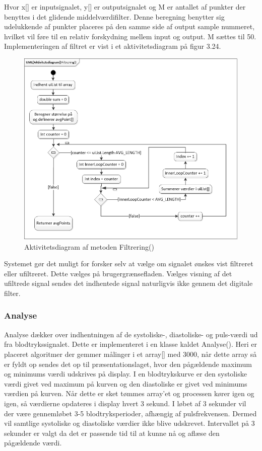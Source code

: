 Hvor x[] er inputsignalet, y[] er outputsignalet og M er antallet af punkter der benyttes i det glidende middelværdifilter. Denne beregning benytter sig udelukkende af punkter placeres på den samme side af output sample nummeret, hvilket vil føre til en relativ forskydning mellem input og output. M sættes til 50. Implementeringen af filtret er vist i et aktivitetsdiagram på figur 3.24.
\begin{figure}[H]
	\centering
	\includegraphics[width=1.0\textwidth]{Figurer/AktFiltrering}
	\caption{Aktivitetsdiagram af metoden Filtrering()}
\end{figure}
Systemet gør det muligt for forsker selv at vælge om signalet ønskes vist filtreret eller ufiltreret. Dette vælges på brugergrænsefladen. Vælges visning af det ufiltrede signal sendes det indhentede signal naturligvis ikke gennem det digitale filter. 

\subsubsection{Analyse}
Analyse dækker over indhentningen af de systoliske-, diastoliske- og puls-værdi ud fra blodtrykssignalet. Dette er implementeret i en klasse kaldet Analyse(). Heri er placeret algoritmer der gemmer målinger i et array[] med 3000, når dette array så er fyldt op sendes det op til præsentationslaget, hvor den pågældende maximum og minimums værdi udskrives på display. I en blodtrykskurve er den systoliske værdi givet ved maximum på kurven og den diastoliske er givet ved minimums værdien på kurven. Når dette er sket tømmes array’et og processen kører igen og igen, så værdierne opdateres i display hvert 3 sekund. I løbet af 3 sekunder vil der være gennemløbet 3-5 blodtryksperioder, afhængig af pulsfrekvensen. Dermed vil samtlige systoliske og diastoliske værdier ikke blive udskrevet. Intervallet på 3 sekunder er valgt da det er passende tid til at kunne nå og aflæse den pågældende værdi.

